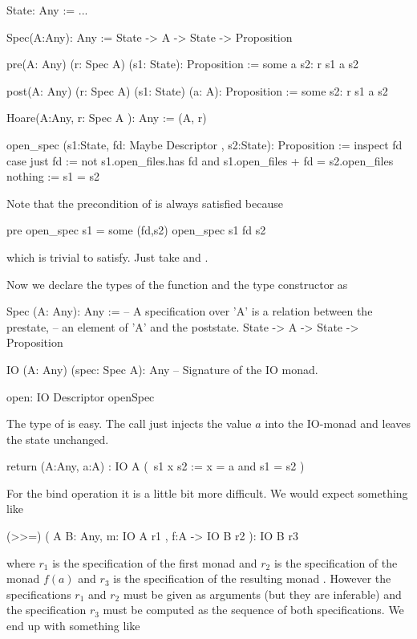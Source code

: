 \begin{alba}
  State: Any := ...

  Spec(A:Any): Any :=
    State -> A -> State -> Proposition

  pre(A: Any) (r: Spec A)  (s1: State): Proposition :=
    some a s2: r s1 a s2

  post(A: Any) (r: Spec A) (s1: State) (a: A): Proposition :=
    some s2: r s1 a s2


  Hoare(A:Any, r: Spec A ): Any := (A, r)

  open_spec (s1:State, fd: Maybe Descriptor , s2:State): Proposition :=
    inspect fd case
      just fd  :=
        not s1.open_files.has fd
        and
        s1.open_files + fd = s2.open_files
      nothing :=
        s1 = s2
\end{alba}
Note that the precondition of  is always satisfied because
%
\begin{alba}
   pre open_spec s1  = some (fd,s2) open_spec s1 fd s2
\end{alba}
%
which is trivial to satisfy. Just take  and .

Now we declare the types of the function  and the type constructor
 as
%
\begin{alba}
    Spec (A: Any): Any :=
            -- A specification over 'A' is a relation between the prestate,
            -- an element of 'A' and the poststate.
        State -> A -> State -> Proposition

    IO (A: Any) (spec: Spec A): Any
        -- Signature of the IO monad.

    open: IO Descriptor openSpec
\end{alba}
%
The type of  is easy. The call  just injects the
value $a$ into the IO-monad and leaves the state unchanged.
%
\begin{alba}
  return (A:Any, a:A)
         : IO  A
               (\ s1 x s2 :=
                   x  = a and
                   s1 = s2 )
\end{alba}
%
For the bind operation it is a little bit more difficult. We would expect
something like
%
\begin{alba}
  (>>=) ( A B: Any,
          m: IO A r1 ,
          f:A -> IO B r2
        ): IO B r3
\end{alba}
%
where $r_1$ is the specification of the first monad and $r_2$ is the
specification of the monad $f(a)$ and $r_3$ is the specification of the
resulting monad . However the specifications $r_1$ and $r_2$
must be given as arguments (but they are inferable) and the specification
$r_3$ must be computed as the sequence of both specifications. We end up with
something like

